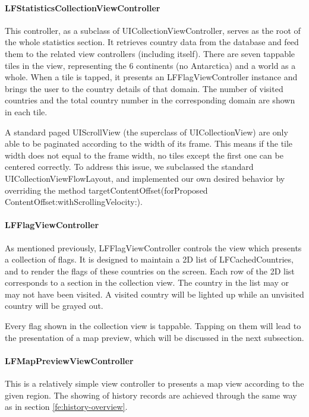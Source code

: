 \documentclass[12pt,a4paper]{article}
\renewcommand\texttt[1]{{\ttfamily\color{textttColor}#1}}
\begin{document}
            \paragraph{LFStatisticsCollectionViewController}
            This controller, as a subclass of \texttt{UICollectionViewController}, serves as the root of the whole statistics section. It retrieves country data from the database and feed them to the related view controllers (including itself). There are seven tappable tiles in the view, representing the 6 continents (no Antarctica) and a world as a whole. When a tile is tapped, it presents an \texttt{LFFlagViewController} instance and brings the user to the country details of that domain. The number of visited countries and the total country number in the corresponding domain are shown in each tile.
            
            A standard paged \texttt{UIScrollView} (the superclass of \texttt{UICollectionView}) are only able to be paginated according to the width of its frame. This means if the tile width does not equal to the frame width, no tiles except the first one can be centered correctly. To address this issue, we subclassed the standard \texttt{UICollectionViewFlowLayout}, and implemented our own desired behavior by overriding the method \texttt{targetContentOffset(forProposed} \texttt{ContentOffset:withScrollingVelocity:)}.
            
            \paragraph{LFFlagViewController} As mentioned previously, \texttt{LFFlagViewController} controls the view which presents a collection of flags. It is designed to maintain a 2D list of \texttt{LFCachedCountries}, and to render the flags of these countries on the screen. Each row of the 2D list corresponds to a section in the collection view. The country in the list may or may not have been visited. A visited country will be lighted up while an unvisited country will be grayed out.
            
            Every flag shown in the collection view is tappable. Tapping on them will lead to the presentation of a map preview, which will be discussed in the next subsection.
            
            \paragraph{LFMapPreviewViewController} This is a relatively simple view controller to presents a map view according to the given region. The showing of history records are achieved through the same way as in section \ref{fe:history-overview}.
            
\end{document}
